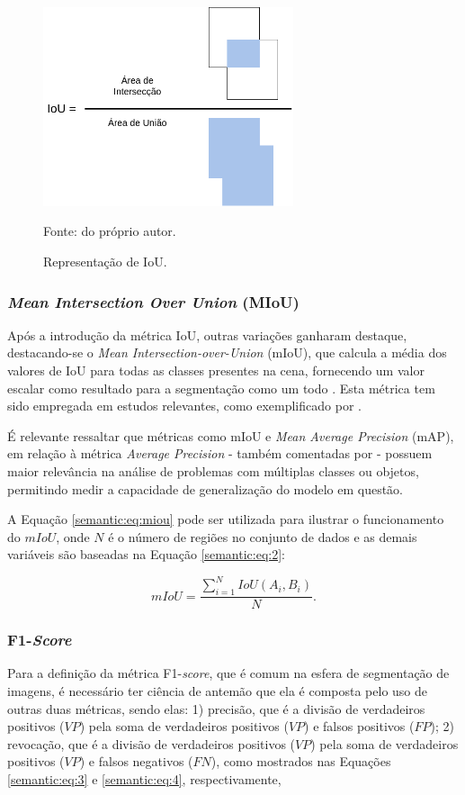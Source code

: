 \begin{figure}[H]
    \centering
    \caption{Representação de IoU.}
    \includegraphics[height=2.3in]{recursos/imagens/semantic/IoU.png}
    \label{semantic:fig:1}

    Fonte: do próprio autor.
\end{figure}

\subsubsection{\textit{Mean Intersection Over Union} (MIoU)}
\label{semantic:miou}
Após a introdução da métrica IoU, outras variações ganharam destaque, destacando-se o \textit{Mean Intersection-over-Union} (mIoU), que calcula a média dos valores de IoU para todas as classes presentes na cena, fornecendo um valor escalar como resultado para a segmentação como um todo \citep{Minaee2021}. Esta métrica tem sido empregada em estudos relevantes, como exemplificado por \cite{Mohan2020}.

É relevante ressaltar que métricas como mIoU e \textit{Mean Average Precision} (mAP), em relação à métrica \textit{Average Precision} - também comentadas por \cite{Padilla2021} - possuem maior relevância na análise de problemas com múltiplas classes ou objetos, permitindo medir a capacidade de generalização do modelo em questão.

A Equação \ref{semantic:eq:miou} pode ser utilizada para ilustrar o funcionamento do $mIoU$, onde $N$ é o número de regiões no conjunto de dados e as demais variáveis são baseadas na Equação \ref{semantic:eq:2}:

\begin{equation}
    \label{semantic:eq:miou}
    mIoU = \frac{\sum_{i=1}^N IoU(A_i, B_i)}{N}.
\end{equation}

\subsubsection{F1-\textit{Score}}
\label{semantic:f1}
Para a definição da métrica F1-\textit{score}, que é comum na esfera de segmentação de imagens, é necessário ter ciência de antemão que ela é composta pelo uso de outras duas métricas, sendo elas: 1) precisão, que é a divisão de verdadeiros positivos ($VP$) pela soma de verdadeiros positivos ($VP$) e falsos positivos ($FP$); 2) revocação, que é a divisão de verdadeiros positivos ($VP$) pela soma de verdadeiros positivos ($VP$) e falsos negativos ($FN$), como mostrados nas Equações \ref{semantic:eq:3} e \ref{semantic:eq:4}, respectivamente,

